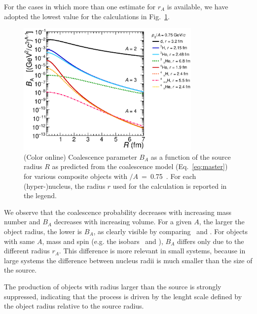 \documentclass{appolb}
\begin{document}
For the cases in which more than one estimate for $r_A$ is available, we have adopted the lowest value for the calculations in Fig.~\ref{Fig:BA}.
%
%
\begin{figure}[htb]
\begin{center}
\includegraphics[width=0.8\textwidth]{coalescenceBA075.eps}
\caption{(Color online) Coalescence parameter $B_A$ as a function of the source radius $R$ as predicted from the coalescence model (Eq.~\ref{eq:master}) for various composite objects with \pt$/A$~=~0.75~\GeVc. For each (hyper-)nucleus, the radius $r$ used for the calculation is reported in the legend.}
\label{Fig:BA}
\end{center}
\end{figure} 
%
%
We observe that the coalescence probability decreases with increasing mass number and $B_A$ decreases with increasing volume. 
For a given $A$, the larger the object radius, the lower is $B_A$, as clearly visible by comparing \hethree~and \hthreelambda. 
For objects with same $A$, mass and spin (e.g. the isobars \tritium~and \hethree), $B_A$ differs only due to the different radius $r_A$. 
This difference is more relevant in small systems, because in large systems the difference between nucleus radii is much smaller than the size of the source.  

The production of objects with radius larger than the source is strongly suppressed, indicating that the process is driven by the lenght scale defined by the object radius relative to the source radius.
\end{document}
